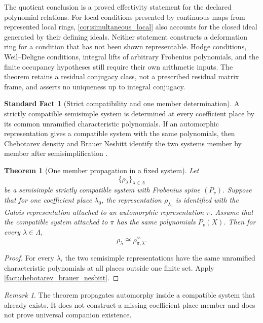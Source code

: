 \documentclass[11pt]{amsart}
\newtheorem{theorem}{Theorem}[section]
\theoremstyle{definition}
\newtheorem{standardfact}[standardfact]{Standard Fact}
\theoremstyle{remark}
\newtheorem{remark}[remark]{Remark}
\begin{document}
The quotient conclusion is a proved effectivity statement for the declared polynomial relations. For local conditions presented by continuous maps from represented local rings, \cref{cor:simultaneous_local} also accounts for the closed ideal generated by their defining ideals. Neither statement constructs a deformation ring for a condition that has not been shown representable. Hodge conditions, Weil--Deligne conditions, integral lifts of arbitrary Frobenius polynomials, and the finite occupancy hypotheses still require their own arithmetic inputs. The theorem retains a residual conjugacy class, not a prescribed residual matrix frame, and asserts no uniqueness up to integral conjugacy.

\begin{standardfact}[Strict compatibility and one member determination]\label{fact:strict_compatibility}
A strictly compatible semisimple system is determined at every coefficient place by its common unramified characteristic polynomials. If an automorphic representation gives a compatible system with the same polynomials, then Chebotarev density and Brauer Nesbitt identify the two systems member by member after semisimplification
\cite{Serre1977,BarnetLambGeeGeraghtyTaylor2014}.
\end{standardfact}

\begin{theorem}[One member propagation in a fixed system]\label{thm:one_member_propagation}
Let
\[
\{\rho_\lambda\}_{\lambda\in\Lambda}
\]
be a semisimple strictly compatible system with Frobenius spine \((P_v)\). Suppose that for one coefficient place \(\lambda_0\), the representation \(\rho_{\lambda_0}\) is identified with the Galois representation attached to an automorphic representation \(\pi\). Assume that the compatible system attached to \(\pi\) has the same polynomials \(P_v(X)\). Then for every \(\lambda\in\Lambda\),
\[
\boxed{
\rho_\lambda
\cong
\rho_{\pi,\lambda}^{\mathrm{ss}}.
}
\]
\end{theorem}

\begin{proof}
For every \(\lambda\), the two semisimple representations have the same unramified characteristic polynomials at all places outside one finite set. Apply \cref{fact:chebotarev_brauer_nesbitt}.
\end{proof}

\begin{remark}
The theorem propagates automorphy inside a compatible system that already exists. It does not construct a missing coefficient place member and does not prove universal companion existence.
\end{remark}
\end{document}
